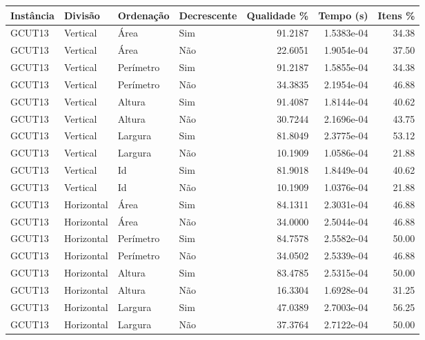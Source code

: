 \begin{tabular}{llllrrr}
    \hline
    Instância & Divisão     & Ordenação & Decrescente & Qualidade \% & Tempo (s)  & Itens \% \\
    \hline
    GCUT13    & Vertical    & Área      & Sim         & 91.2187      & 1.5383e-04 & 34.38    \\
    GCUT13    & Vertical    & Área      & Não         & 22.6051      & 1.9054e-04 & 37.50    \\
    GCUT13    & Vertical    & Perímetro & Sim         & 91.2187      & 1.5855e-04 & 34.38    \\
    GCUT13    & Vertical    & Perímetro & Não         & 34.3835      & 2.1954e-04 & 46.88    \\
    GCUT13    & Vertical    & Altura    & Sim         & 91.4087      & 1.8144e-04 & 40.62    \\
    GCUT13    & Vertical    & Altura    & Não         & 30.7244      & 2.1696e-04 & 43.75    \\
    GCUT13    & Vertical    & Largura   & Sim         & 81.8049      & 2.3775e-04 & 53.12    \\
    GCUT13    & Vertical    & Largura   & Não         & 10.1909      & 1.0586e-04 & 21.88    \\
    GCUT13    & Vertical    & Id        & Sim         & 81.9018      & 1.8449e-04 & 40.62    \\
    GCUT13    & Vertical    & Id        & Não         & 10.1909      & 1.0376e-04 & 21.88    \\
    GCUT13    & Horizontal  & Área      & Sim         & 84.1311      & 2.3031e-04 & 46.88    \\
    GCUT13    & Horizontal  & Área      & Não         & 34.0000      & 2.5044e-04 & 46.88    \\
    GCUT13    & Horizontal  & Perímetro & Sim         & 84.7578      & 2.5582e-04 & 50.00    \\
    GCUT13    & Horizontal  & Perímetro & Não         & 34.0502      & 2.5339e-04 & 46.88    \\
    GCUT13    & Horizontal  & Altura    & Sim         & 83.4785      & 2.5315e-04 & 50.00    \\
    GCUT13    & Horizontal  & Altura    & Não         & 16.3304      & 1.6928e-04 & 31.25    \\
    GCUT13    & Horizontal  & Largura   & Sim         & 47.0389      & 2.7003e-04 & 56.25    \\
    GCUT13    & Horizontal  & Largura   & Não         & 37.3764      & 2.7122e-04 & 50.00    \\

\end{tabular}
